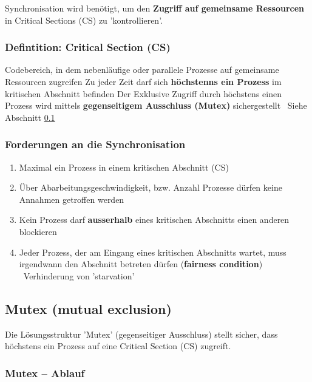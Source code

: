 Synchronisation wird benötigt, um den \textbf{Zugriff auf gemeinsame Ressourcen} in Critical Sections (CS) zu 'kontrollieren'.


\subsubsection{Defintition: Critical Section (CS)}

\begin{outline}
    \1 Codebereich, in dem nebenläufige oder parallele Prozesse auf gemeinsame Ressourcen zugreifen
        \2 Zu jeder Zeit darf sich \textbf{höchstenns ein Prozess} im kritischen Abschnitt befinden
    \1 Der Exklusive Zugriff durch höchstens einen Prozess wird mittels \textbf{gegenseitigem Ausschluss (Mutex)} sichergestellt
        \textrightarrow\ Siehe Abschnitt \ref{Mutex (mutual exclusion)}
\end{outline}


\subsubsection{Forderungen an die Synchronisation}

\begin{enumerate}
    \item Maximal ein Prozess in einem kritischen Abschnitt (CS)
    \item Über Abarbeitungsgeschwindigkeit, bzw. Anzahl Prozesse dürfen keine Annahmen getroffen werden
    \item Kein Prozess darf \textbf{ausserhalb} eines kritischen Abschnitts einen anderen blockieren
    \item Jeder Prozess, der am Eingang eines kritischen Abschnitts wartet, muss irgendwann den Abschnitt betreten dürfen 
        (\textbf{fairness condition}) \textrightarrow\ Verhinderung von 'starvation'
\end{enumerate}


\subsection{Mutex (mutual exclusion)}
\label{Mutex (mutual exclusion)}

Die Lösungsstruktur 'Mutex' (gegenseitiger Ausschluss) stellt sicher, dass höchstens ein Prozess auf eine Critical Section (CS) zugreift. 


\subsubsection{Mutex -- Ablauf}

